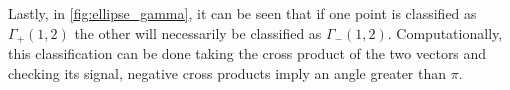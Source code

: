 Lastly, in \autoref{fig:ellipse_gamma}, it can be seen that if one point is classified as $\Gamma_+(1,2)$ the other will necessarily be classified as $\Gamma_-(1,2)$.
Computationally, this classification can be done taking the cross product of the two vectors and checking its signal, negative cross products imply an angle greater than $\pi$.

